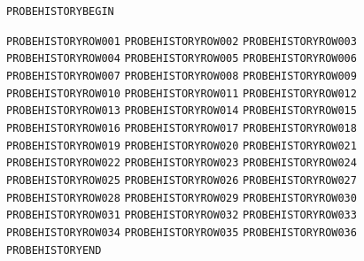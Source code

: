 \begin{HistoryBox}
\texttt{PROBEHISTORYBEGIN}\par
\texttt{PROBEHISTORYROW001}\quad\EditorialProbeParagraph
\texttt{PROBEHISTORYROW002}\quad\EditorialProbeParagraph
\texttt{PROBEHISTORYROW003}\quad\EditorialProbeParagraph
\texttt{PROBEHISTORYROW004}\quad\EditorialProbeParagraph
\texttt{PROBEHISTORYROW005}\quad\EditorialProbeParagraph
\texttt{PROBEHISTORYROW006}\quad\EditorialProbeParagraph
\texttt{PROBEHISTORYROW007}\quad\EditorialProbeParagraph
\texttt{PROBEHISTORYROW008}\quad\EditorialProbeParagraph
\texttt{PROBEHISTORYROW009}\quad\EditorialProbeParagraph
\texttt{PROBEHISTORYROW010}\quad\EditorialProbeParagraph
\texttt{PROBEHISTORYROW011}\quad\EditorialProbeParagraph
\texttt{PROBEHISTORYROW012}\quad\EditorialProbeParagraph
\texttt{PROBEHISTORYROW013}\quad\EditorialProbeParagraph
\texttt{PROBEHISTORYROW014}\quad\EditorialProbeParagraph
\texttt{PROBEHISTORYROW015}\quad\EditorialProbeParagraph
\texttt{PROBEHISTORYROW016}\quad\EditorialProbeParagraph
\texttt{PROBEHISTORYROW017}\quad\EditorialProbeParagraph
\texttt{PROBEHISTORYROW018}\quad\EditorialProbeParagraph
\texttt{PROBEHISTORYROW019}\quad\EditorialProbeParagraph
\texttt{PROBEHISTORYROW020}\quad\EditorialProbeParagraph
\texttt{PROBEHISTORYROW021}\quad\EditorialProbeParagraph
\texttt{PROBEHISTORYROW022}\quad\EditorialProbeParagraph
\texttt{PROBEHISTORYROW023}\quad\EditorialProbeParagraph
\texttt{PROBEHISTORYROW024}\quad\EditorialProbeParagraph
\texttt{PROBEHISTORYROW025}\quad\EditorialProbeParagraph
\texttt{PROBEHISTORYROW026}\quad\EditorialProbeParagraph
\texttt{PROBEHISTORYROW027}\quad\EditorialProbeParagraph
\texttt{PROBEHISTORYROW028}\quad\EditorialProbeParagraph
\texttt{PROBEHISTORYROW029}\quad\EditorialProbeParagraph
\texttt{PROBEHISTORYROW030}\quad\EditorialProbeParagraph
\texttt{PROBEHISTORYROW031}\quad\EditorialProbeParagraph
\texttt{PROBEHISTORYROW032}\quad\EditorialProbeParagraph
\texttt{PROBEHISTORYROW033}\quad\EditorialProbeParagraph
\texttt{PROBEHISTORYROW034}\quad\EditorialProbeParagraph
\texttt{PROBEHISTORYROW035}\quad\EditorialProbeParagraph
\texttt{PROBEHISTORYROW036}\quad\EditorialProbeParagraph
\texttt{PROBEHISTORYEND}
\end{HistoryBox}
\clearpage
